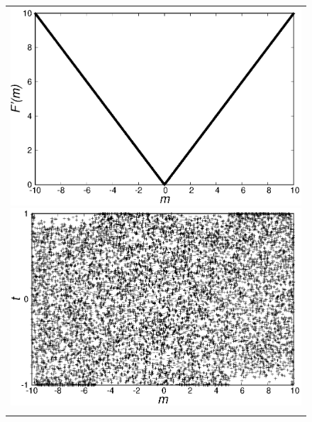\documentclass[fp,twocolumn]{jpsj3}
\begin{document}
\begin{figure}[htbp]
  \begin{center}
    \begin{tabular}{c}
      \begin{minipage}{0.50\hsize}
        \centering
        \includegraphics[keepaspectratio,scale=0.33]{minimum_cost.eps}
      \end{minipage}
      \begin{minipage}{0.50\hsize}
        \centering
        \includegraphics[keepaspectratio,scale=0.33]{minimum_t.eps}
      \end{minipage} \\
      \begin{minipage}{0.50\hsize}
        \centering

\end{minipage}
\end{tabular}
\end{center}
\end{figure}
\end{document}
